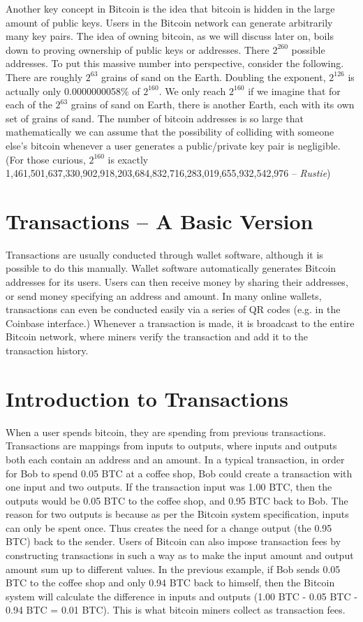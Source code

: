 \documentclass[11pt]{article}
\begin{document}
    Another key concept in Bitcoin is the idea that bitcoin is hidden in the large amount of public keys. Users in the Bitcoin network can generate arbitrarily many key pairs. The idea of owning bitcoin, as we will discuss later on, boils down to proving ownership of public keys or addresses. There $2^{260}$ possible addresses. To put this massive number into perspective, consider the following. There are roughly $2^{63}$ grains of sand on the Earth. Doubling the exponent, $2^{126}$ is actually only 0.0000000058\% of $2^{160}$. We only reach $2^{160}$ if we imagine that for each of the $2^{63}$ grains of sand on Earth, there is another Earth, each with its own set of grains of sand. The number of bitcoin addresses is so large that mathematically we can assume that the possibility of colliding with someone else's bitcoin whenever a user generates a public/private key pair is negligible. (For those curious, $2^{160}$ is exactly 1,461,501,637,330,902,918,203,684,832,716,283,019,655,932,542,976 -- \textit{Rustie}) 
    
    \section*{Transactions -- A Basic Version}
    
    Transactions are usually conducted through wallet software, although it is possible to do this manually. Wallet software automatically generates Bitcoin addresses for its users. Users can then receive money by sharing their addresses, or send money specifying an address and amount. In many online wallets, transactions can even be conducted easily via a series of QR codes (e.g. in the Coinbase interface.) Whenever a transaction is made, it is broadcast to the entire Bitcoin network, where miners verify the transaction and add it to the transaction history.
    
    \section*{Introduction to Transactions}
    
    When a user spends bitcoin, they are spending from previous transactions. Transactions are mappings from inputs to outputs, where inputs and outputs both each contain an address and an amount. In a typical transaction, in order for Bob to spend 0.05 BTC at a coffee shop, Bob could create a transaction with one input and two outputs. If the transaction input was 1.00 BTC, then the outputs would be 0.05 BTC to the coffee shop, and 0.95 BTC back to Bob. The reason for two outputs is because as per the Bitcoin system specification, inputs can only be spent once. Thus creates the need for a change output (the 0.95 BTC) back to the sender. Users of Bitcoin can also impose transaction fees by constructing transactions in such a way as to make the input amount and output amount sum up to different values. In the previous example, if Bob sends 0.05 BTC to the coffee shop and only 0.94 BTC back to himself, then the Bitcoin system will calculate the difference in inputs and outputs (1.00 BTC - 0.05 BTC - 0.94 BTC = 0.01 BTC). This is what bitcoin miners collect as transaction fees. 
    
\end{document}
